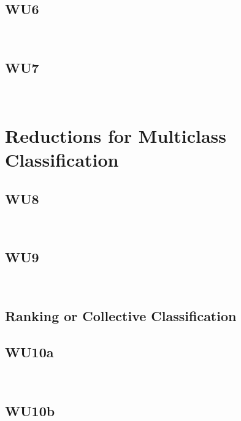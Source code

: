 \documentclass[a4paper,11pt]{article}
\begin{document}
\subsection{WU6}
\textsf{}\\

\subsection{WU7}
\textsf{}\\

\section{Reductions for Multiclass Classification}
\subsection{WU8}
\textsf{}\\

\subsection{WU9}
\textsf{}\\

\subsection{Ranking or Collective Classification}
\subsection{WU10a}
\textsf{}\\


\subsection{WU10b}
\textsf{}\\



      
\end{document}
